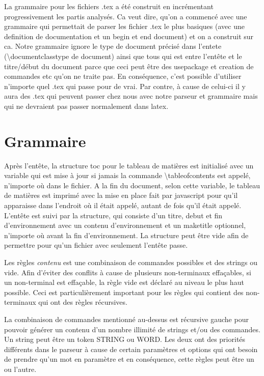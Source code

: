 \documentclass{report}
\begin{document}
La grammaire pour les fichiers .tex a été construit en incrémentant progressivement les partis analysés.
Ca veut dire, qu'on a commencé avec une grammaire qui permettait de parser les fichier .tex le plus basiques (avec une definition de documentation et un begin et end document) et on a construit sur ca. Notre grammaire ignore le type de document précisé dans l'entete (\textbackslash documentclass{type de document}) ainsi que tous qui est entre l'entête et le titre/début du document parce que ceci peut être des usepackage et creation de commandes etc qu'on  ne traite pas.
En conséquence, c'est possible d'utiliser n'importe quel .tex qui passe pour de vrai. Par contre, à cause de celui-ci il y aura des .tex qui peuvent passer chez nous avec notre parseur et grammaire mais qui ne devraient pas passer normalement dans latex.

\section{Grammaire}
Après l'entête, la structure toc pour le tableau de matières est initialisé avec un variable qui est mise à jour si jamais la commande \textbackslash tableofcontents est appelé, n'importe où dans le fichier. A la fin du document, selon cette variable, le tableau de matières est imprimé avec la mise en place fait par javascript pour qu'il apparaisse dans l'endroit où il était appelé, autant de fois qu'il était appelé.  L'entête est suivi par la structure, qui consiste d'un titre,  debut et fin d'environnement avec un contenu d'environnement et un maketitle optionnel, n'importe où avant la fin d'environnement. La structure peut être vide afin de permettre pour qu'un fichier avec seulement l'entête passe. 

Les règles \textit{contenu} est une combinaison de commandes possibles et des strings ou vide. Afin d'éviter des conflits à cause de plusieurs non-terminaux effaçables, si un non-terminal est effaçable, la règle vide est déclaré au niveau le plus haut possible. Ceci est particulièrement important pour les règles qui contient des non-terminaux qui ont des règles récursives.

 La combinaison de commandes mentionné au-dessus est récursive gauche pour pouvoir générer un contenu d'un nombre illimité de strings et/ou des commandes. Un string peut être un token STRING ou WORD. Les deux ont des priorités différents dans le parseur à cause de certain paramètres et options qui ont besoin de prendre qu'un mot en paramètre et en conséquence, cette règles peut être un ou l'autre.
\end{document}
